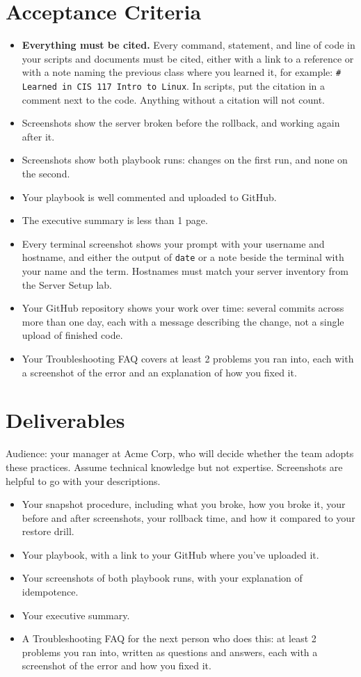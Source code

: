 \documentclass[12pt]{article}
\begin{document}
\section*{Acceptance Criteria}
\begin{itemize}
    \item \textbf{Everything must be cited.} Every command, statement, and line of code in your scripts and documents must be cited, either with a link to a reference or with a note naming the previous class where you learned it, for example: \texttt{\# Learned in CIS 117 Intro to Linux}. In scripts, put the citation in a comment next to the code. Anything without a citation will not count.
    \item Screenshots show the server broken before the rollback, and working again after it.
    \item Screenshots show both playbook runs: changes on the first run, and none on the second.
    \item Your playbook is well commented and uploaded to GitHub.
    \item The executive summary is less than 1 page.
    \item Every terminal screenshot shows your prompt with your username and hostname, and either the output of \texttt{date} or a note beside the terminal with your name and the term. Hostnames must match your server inventory from the Server Setup lab.
    \item Your GitHub repository shows your work over time: several commits across more than one day, each with a message describing the change, not a single upload of finished code.
    \item Your Troubleshooting FAQ covers at least 2 problems you ran into, each with a screenshot of the error and an explanation of how you fixed it.
\end{itemize}

\section*{Deliverables}
Audience: your manager at Acme Corp, who will decide whether the team adopts these practices. Assume technical knowledge but not expertise.  Screenshots are helpful to go with your descriptions.

\begin{itemize}
    \item Your snapshot procedure, including what you broke, how you broke it, your before and after screenshots, your rollback time, and how it compared to your restore drill.
    \item Your playbook, with a link to your GitHub where you've uploaded it.
    \item Your screenshots of both playbook runs, with your explanation of idempotence.
    \item Your executive summary.
    \item A Troubleshooting FAQ for the next person who does this: at least 2 problems you ran into, written as questions and answers, each with a screenshot of the error and how you fixed it.
\end{itemize}
\end{document}
